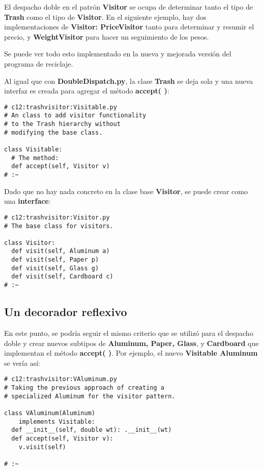 El despacho doble en el patrón \textbf{Visitor} se ocupa de determinar tanto el tipo de \textbf{Trash} como el tipo de \textbf{Visitor}. En el siguiente ejemplo, hay dos implementaciones de \textbf{Visitor: PriceVisitor} tanto para determinar y resumir el precio, y \textbf{WeightVisitor} para hacer un seguimiento de los pesos.      \newline

Se puede ver todo esto implementado en la nueva y mejorada versión del programa de reciclaje.        \newline

Al igual que con \textbf{DoubleDispatch.py}, la clase \textbf{Trash} se deja sola y una nueva interfaz es creada para agregar el método \textbf{accept( )}: \newline

\begin{lstlisting} 
# c12:trashvisitor:Visitable.py 
# An class to add visitor functionality  
# to the Trash hierarchy without  
# modifying the base class. 

class Visitable: 
  # The method: 
  def accept(self, Visitor v) 
# :~ 
\end{lstlisting}

Dado que no hay nada concreto en la clase base \textbf{Visitor}, se puede crear como una \textbf{interface}: \newline

\begin{lstlisting} 
# c12:trashvisitor:Visitor.py 
# The base class for visitors. 

class Visitor: 
  def visit(self, Aluminum a) 
  def visit(self, Paper p) 
  def visit(self, Glass g) 
  def visit(self, Cardboard c) 
# :~ 
\end{lstlisting}


\subsection*{Un decorador reflexivo}
\label{subsec:udr}


En este punto, se podría seguir el mismo criterio que se utilizó para el despacho doble y crear nuevos subtipos de \textbf{Aluminum, Paper, Glass}, y \textbf{Cardboard} que implementan el método \textbf{accept( )}. Por ejemplo, el nuevo \textbf{Visitable Aluminum} se vería así: \newline

\begin{lstlisting} 
# c12:trashvisitor:VAluminum.py 
# Taking the previous approach of creating a 
# specialized Aluminum for the visitor pattern. 

class VAluminum(Aluminum)  
    implements Visitable: 
  def __init__(self, double wt): .__init__(wt)  
  def accept(self, Visitor v): 
    v.visit(self) 

# :~ 
\end{lstlisting}

